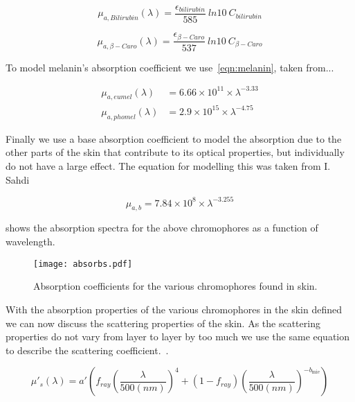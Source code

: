 \begin{equation}
\mu_{a,Bilirubin}(\lambda)=\frac{\epsilon_{bilirubin}}{585}\ ln10\ C_{bilirubin}
\label{eqn:bili}
\end{equation}

\begin{equation}
\mu_{a,\beta-Caro}(\lambda)=\frac{\epsilon_{\beta-Caro}}{537}\ ln10\ C_{\beta-Caro}
\label{eqn:caro}
\end{equation}

To model melanin's absorption coefficient we use~\cref{eqn:melanin}, taken from...

\begin{align}
\mu_{a,eumel}(\lambda)&=6.66\times10^{11} \times \lambda^{-3.33}\\
\mu_{a,phomel}(\lambda)&=2.9\times10^{15} \times \lambda^{-4.75}
\label{eqn:melanin}
\end{align}

Finally we use a base absorption coefficient to model the absorption due to the other parts of the skin that contribute to its optical properties, but individually do not have a large effect.
The equation for modelling this was taken from I. Sahdi~\cite{saidi1992transcutaneous}

\begin{equation}
\mu_{a,b}=7.84\times10^{8}\times\lambda^{-3.255}
\label{eqn:base}
\end{equation}


 shows the absorption spectra for the above chromophores as a function of wavelength.

\begin{figure}[!htpb]
	\centering
	\texttt{[image: absorbs.pdf]}
	\caption{Absorption coefficients for the various chromophores found in skin.}
	\label{fig:absorcoeff}
\end{figure}

With the absorption properties of the various chromophores in the skin defined we can now discuss the scattering properties of the skin.
As the scattering properties do not vary from layer to layer by too much we use the same equation to describe the scattering coefficient.~\cite{jacques2013optical,iglesias2015biophysically,louisethesis}.

\begin{equation}
\mu'_s(\lambda)=a'\left(f_{ray}\left(\frac{\lambda}{500(nm)}\right)^4+(1-f_{ray})\left(\frac{\lambda}{500(nm)}\right)^{-b_{\text{mie}}}\right)
\label{eqn:scattrest}
\end{equation}

